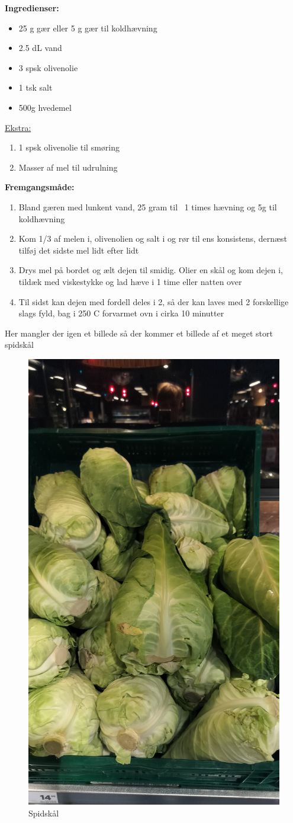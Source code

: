 \documentclass{book}
\begin{document}
\begin{minipage}[t]{0.5\textwidth}
\textbf{Ingredienser:}
\begin{itemize}
    \item 25 g gær eller 5 g gær til koldhævning
    \item 2.5 dL vand
    \item 3 spsk olivenolie
    \item 1 tsk salt
    \item 500g hvedemel
\end{itemize}
\underline{Ekstra:}
    \begin{enumerate}
        \item  1 spsk olivenolie til smøring
        \item Masser af mel til udrulning
    \end{enumerate}
\end{minipage}
\begin{minipage}[t]{0.5\textwidth}
\textbf{Fremgangsmåde:}
\begin{enumerate}
    \item Bland gæren med lunkent vand, 25 gram til ~1 times hævning og 5g til koldhævning
    \item Kom 1/3 af melen i, olivenolien og salt i og rør til ens konsistens, dernæst tilføj det sidste mel lidt efter lidt
    \item Drys mel på bordet og ælt dejen til smidig. Olier en skål og kom dejen i, tildæk med viskestykke og lad hæve i 1 time eller natten over
    \item Til sidst kan dejen med fordell deles i 2, så der kan laves med 2 forskellige slags fyld, bag i 250 \degree C forvarmet ovn i cirka 10 minutter 
\end{enumerate}
\end{minipage}
\newpage 
Her mangler der igen et billede så der kommer et billede af et meget stort spidskål 
\begin{figure}
    \centering
    \includegraphics[width=0.5\linewidth]{Spidskål.jpg}
    \caption{Spidskål}
\end{figure}
\end{document}

